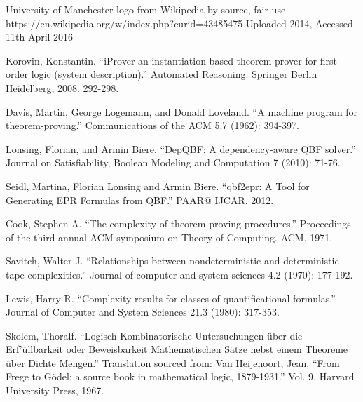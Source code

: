 \begin{thebibliography}{11}

University of Manchester logo from Wikipedia by source, fair use\newline
https://en.wikipedia.org/w/index.php?curid=43485475\newline
Uploaded 2014, Accessed 11th April 2016

Korovin, Konstantin. ``iProver-an instantiation-based theorem prover for first-order logic (system description).'' Automated Reasoning. Springer Berlin Heidelberg, 2008. 292-298.

Davis, Martin, George Logemann, and Donald Loveland. ``A machine program for theorem-proving.'' Communications of the ACM 5.7 (1962): 394-397.

Lonsing, Florian, and Armin Biere. ``DepQBF: A dependency-aware QBF solver.'' Journal on Satisfiability, Boolean Modeling and Computation 7 (2010): 71-76.

Seidl, Martina, Florian Lonsing and Armin Biere. ``qbf2epr: A Tool for Generating EPR Formulas from QBF.'' PAAR@ IJCAR. 2012.
  
Cook, Stephen A. ``The complexity of theorem-proving procedures.'' Proceedings of the third annual ACM symposium on Theory of Computing. ACM, 1971.

Savitch, Walter J. ``Relationships between nondeterministic and deterministic tape complexities.'' Journal of computer and system sciences 4.2 (1970): 177-192.

Lewis, Harry R. ``Complexity results for classes of quantificational formulas.'' Journal of Computer and System Sciences 21.3 (1980): 317-353.

Skolem, Thoralf. ``Logisch-Kombinatorische Untersuchungen {\"u}ber die Erf'{\"u}llbarkeit oder Beweisbarkeit Mathematischen S{\"a}tze nebst einem Theoreme {\"u}ber Dichte Mengen.'' Translation sourced from: Van Heijenoort, Jean. ``From Frege to G{\"o}del: a source book in mathematical logic, 1879-1931.'' Vol. 9. Harvard University Press, 1967.

\end{thebibliography}

